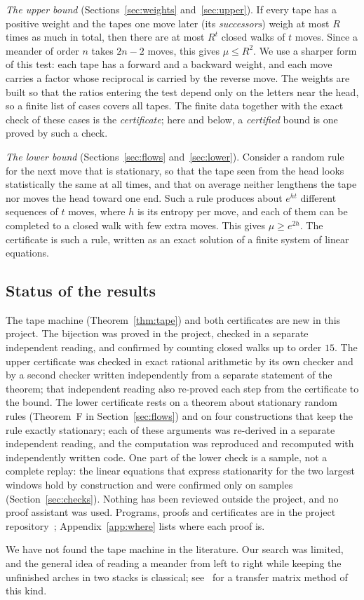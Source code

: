 \emph{The upper bound} (Sections~\ref{sec:weights} and~\ref{sec:upper}). If every tape has a positive weight and the
tapes one move later (its \emph{successors}) weigh at most $R$ times as much in total, then there are at most $R^t$
closed walks of $t$ moves. Since a meander of order $n$ takes $2n-2$ moves, this gives $\mu\le R^2$. We use a sharper
form of this test: each tape has a forward and a backward weight, and each move carries a factor whose reciprocal is
carried by the reverse move. The weights are built so that the ratios entering the test depend only on the letters
near the head, so a finite list of cases covers all tapes. The finite data together with the exact check of these cases is the
\emph{certificate}; here and below, a \emph{certified} bound is one proved by such a check.

\emph{The lower bound} (Sections~\ref{sec:flows} and~\ref{sec:lower}). Consider a random rule for the next move that
is stationary, so that the tape seen from the head looks statistically the same at all times, and that on average
neither lengthens the tape nor moves the head toward one end. Such a rule produces about $e^{ht}$ different sequences
of $t$ moves, where $h$ is its entropy per move, and each of them can be completed to a closed walk with few extra
moves. This gives $\mu\ge e^{2h}$. The certificate is such a rule, written as an exact solution of a finite system of
linear equations.

\subsection{Status of the results}

The tape machine (Theorem~\ref{thm:tape}) and both certificates are new in this project. The bijection was proved in
the project, checked in a separate independent reading, and confirmed by counting closed walks up to order $15$. The
upper certificate was checked in exact rational arithmetic by its own checker and by a second checker written
independently from a separate statement of the theorem; that independent reading also re-proved each step from the
certificate to the bound. The lower certificate rests on a theorem about stationary random rules (Theorem~F in
Section~\ref{sec:flows}) and on four constructions that keep the rule exactly stationary; each of these arguments was
re-derived in a separate independent reading, and the computation was reproduced and recomputed with independently
written code. One part of the lower check is a sample, not a complete replay: the linear equations that express
stationarity for the two largest windows hold by construction and were confirmed only on samples
(Section~\ref{sec:checks}). Nothing has been reviewed outside the project, and no proof assistant was used. Programs,
proofs and certificates are in the project repository~\cite{Repo}; Appendix~\ref{app:where} lists where each proof is.

We have not found the tape machine in the literature. Our search was limited, and the general idea of reading a
meander from left to right while keeping the unfinished arches in two stacks is classical; see~\cite{Jensen} for a transfer matrix method of this
kind.
